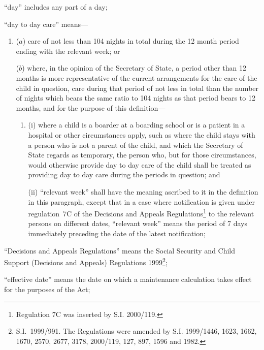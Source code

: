 \documentclass[12pt,a4paper]{article}
\begin{document}
\begin{enumerate}
“day” includes any part of a day;

“day to day care” means—
\begin{enumerate}\item[]
($a$) 
care of not less than 104 nights in total during the 12 month period ending with the relevant week; or

($b$) 
where, in the opinion of the Secretary of State, a period other than 12 months is more representative of the current arrangements for the care of the child in question, care during that period of not less in total than the number of nights which bears the same ratio to 104 nights as that period bears to 12 months, and for the purpose of this definition—
\begin{enumerate}\item[]
(i)
where a child is a boarder at a boarding school or is a patient in a hospital or other circumstances apply, such as where the child stays with a person who is not a parent of the child, and which the Secretary of State regards as temporary, the person who, but for those circumstances, would otherwise provide day to day care of the child shall be treated as providing day to day care during the periods in question; and

(ii)
“relevant week” shall have the meaning ascribed to it in the definition in this paragraph, except that in a case where notification is given under regulation~7C of the Decisions and Appeals Regulations\footnote{\frenchspacing Regulation 7C was inserted by S.I. 2000/119.} to the relevant persons on different dates, “relevant week” means the period of 7 days immediately preceding the date of the latest notification;
\end{enumerate}
\end{enumerate}

“Decisions and Appeals Regulations” means the Social Security and Child Support (Decisions and Appeals) Regulations 1999\footnote{S.I.~1999/991. The Regulations were amended by S.I. 1999/1446, 1623, 1662, 1670, 2570, 2677, 3178, 2000/119, 127, 897, 1596 and 1982.};


“effective date” means the date on which a maintenance calculation takes effect for the purposes of the Act;


\end{enumerate}
\end{document}
